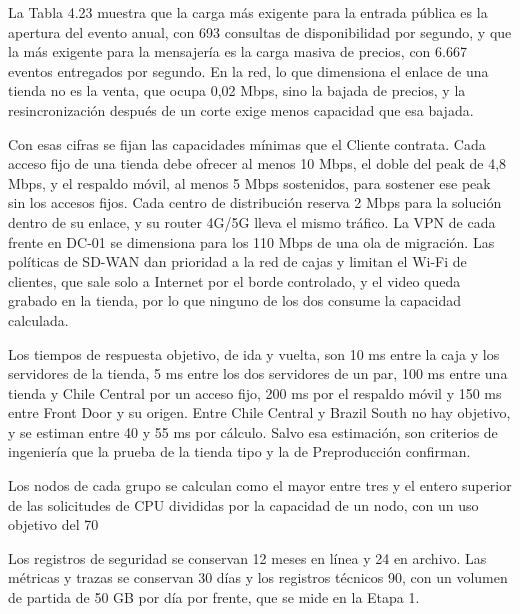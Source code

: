 \documentclass[11pt]{article}
\begin{document}
La Tabla 4.23 muestra que la carga más exigente para la entrada pública es la apertura del evento anual, con 693 consultas de disponibilidad por segundo, y que la más exigente para la mensajería es la carga masiva de precios, con 6.667 eventos entregados por segundo. En la red, lo que dimensiona el enlace de una tienda no es la venta, que ocupa 0,02 Mbps, sino la bajada de precios, y la resincronización después de un corte exige menos capacidad que esa bajada.

Con esas cifras se fijan las capacidades mínimas que el Cliente contrata. Cada acceso fijo de una tienda debe ofrecer al menos 10 Mbps, el doble del peak de 4,8 Mbps, y el respaldo móvil, al menos 5 Mbps sostenidos, para sostener ese peak sin los accesos fijos. Cada centro de distribución reserva 2 Mbps para la solución dentro de su enlace, y su router 4G/5G lleva el mismo tráfico. La VPN de cada frente en DC-01 se dimensiona para los 110 Mbps de una ola de migración. Las políticas de SD-WAN dan prioridad a la red de cajas y limitan el Wi-Fi de clientes, que sale solo a Internet por el borde controlado, y el video queda grabado en la tienda, por lo que ninguno de los dos consume la capacidad calculada.

Los tiempos de respuesta objetivo, de ida y vuelta, son 10 ms entre la caja y los servidores de la tienda, 5 ms entre los dos servidores de un par, 100 ms entre una tienda y Chile Central por un acceso fijo, 200 ms por el respaldo móvil y 150 ms entre Front Door y su origen. Entre Chile Central y Brazil South no hay objetivo, y se estiman entre 40 y 55 ms por cálculo. Salvo esa estimación, son criterios de ingeniería que la prueba de la tienda tipo y la de Preproducción confirman.

Los nodos de cada grupo se calculan como el mayor entre tres y el entero superior de las solicitudes de CPU divididas por la capacidad de un nodo, con un uso objetivo del 70 %

Los registros de seguridad se conservan 12 meses en línea y 24 en archivo. Las métricas y trazas se conservan 30 días y los registros técnicos 90, con un volumen de partida de 50 GB por día por frente, que se mide en la Etapa 1.
\end{document}
